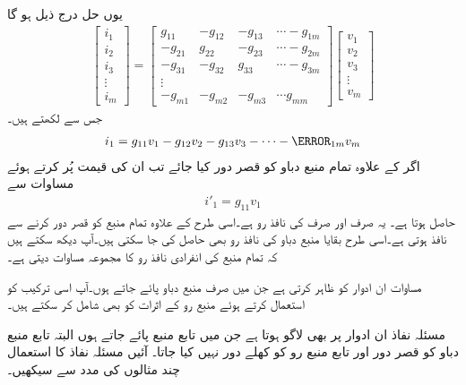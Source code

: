 یوں حل درج ذیل ہو گا
\begin{align*}
\begin{bmatrix}
i_1\\
i_2\\
i_3\\
\vdots\\
i_m
\end{bmatrix}
=
\begin{bmatrix}
g_{11} & -g_{12}& -g_{13}& \cdots -g_{1m}\\
-g_{21} & g_{22}& -g_{23}& \cdots -g_{2m}\\
-g_{31} & -g_{32}& g_{33}& \cdots -g_{3m}\\
\vdots\\
-g_{m1}&-g_{m2}&-g_{m3}&\cdots g_{mm}
\end{bmatrix}
\begin{bmatrix}
v_{1}\\
v_{2}\\
v_{3}\\
\vdots\\
v_{m}
\end{bmatrix}
\end{align*}
جس سے  لکھتے ہیں۔
\begin{align}\label{مساوات_مسئلہ_عمومی_رو_حل}
i_1=g_{11} v_1-g_{12}v_2-g_{13}v_3 -\cdots -\g_{1m}v_m
\end{align}
اگر  کے علاوہ تمام منبع دباو کو قصر دور کیا جائے تب ان کی قیمت  پُر کرتے ہوئے مساوات  سے 
\begin{align*}
i'_1=g_{11} v_1
\end{align*}
حاصل ہوتا ہے۔ یہ صرف اور صرف  کی نافذ رو ہے۔اسی طرح  کے علاوہ تمام منبع کو قصر دور کرنے سے   نافذ ہوتی ہے۔اسی طرح بقایا منبع دباو کی نافذ  رو بھی حاصل کی جا سکتی ہیں۔آپ دیکھ سکتے ہیں کہ تمام  منبع کی انفرادی نافذ رو کا مجموعہ مساوات  دیتی ہے۔

مساوات  ان ادوار کو ظاہر کرتی ہے جن میں صرف منبع دباو پائے جاتے ہوں۔آپ اسی ترکیب کو استعمال کرتے ہوئے منبع رو کے اثرات کو بھی شامل کر سکتے ہیں۔

مسئلہ نفاذ  ان ادوار پر بھی لاگو ہوتا  ہے جن میں تابع منبع  پائے جاتے ہوں البتہ تابع منبع دباو کو قصر دور اور تابع منبع رو کو کھلے دور نہیں کیا جاتا۔ آئیں مسئلہ نفاذ کا استعمال چند مثالوں کی مدد سے سیکھیں۔

